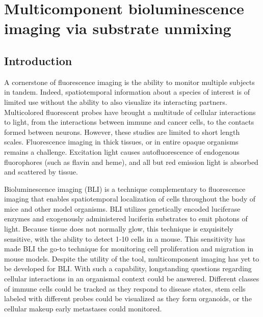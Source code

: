 
\chapter{Multicomponent bioluminescence imaging via substrate unmixing}
\section{Introduction}
A cornerstone of fluorescence imaging is the ability to monitor multiple subjects in tandem.\cite{RodriguezGrowingGlowingToolbox2017}
Indeed, spatiotemporal information about a species of interest is of limited use without the ability to also visualize its interacting partners. Multicolored fluorescent probes have brought a multitude of cellular interactions to light, from the interactions between immune and cancer cells\cite{GermainDecadeImagingCellular2012}, to the contacts formed between neurons.\cite{ChoiInterregionalsynapticmaps2018}
However, these studies are limited to short length scales.
Fluorescence imaging in thick tissues, or in entire opaque organisms remains a challenge. Excitation light causes autofluorescence of endogenous fluorophores (such as flavin and heme), and all but red emission light is absorbed and scattered by tissue.\cite{ZhaoEmissionspectrabioluminescent2005}

Bioluminescence imaging (BLI) is a technique complementary to fluorescence imaging that enables spatiotemporal localization of cells throughout the body of mice and other model organisms. BLI utilizes genetically encoded luciferase enzymes and exogenously administered luciferin substrates to emit photons of light. Because tissue does not normally glow, this technique is exquisitely sensitive, with the ability to detect 1-10 cells in a mouse.
This sensitivity has made BLI the go-to technique for monitoring cell proliferation and migration in mouse models.\cite{PaleyBioluminescenceversatiletechnique2014}
Despite the utility of the tool, multicomponent imaging has yet to be developed for BLI. With such a capability, longstanding questions regarding cellular interactions in an organismal context could be answered. Different classes of immune cells could be tracked as they respond to disease states, stem cells labeled with different probes could be visualized as they form organoids, or the cellular makeup early metastases could monitored.

